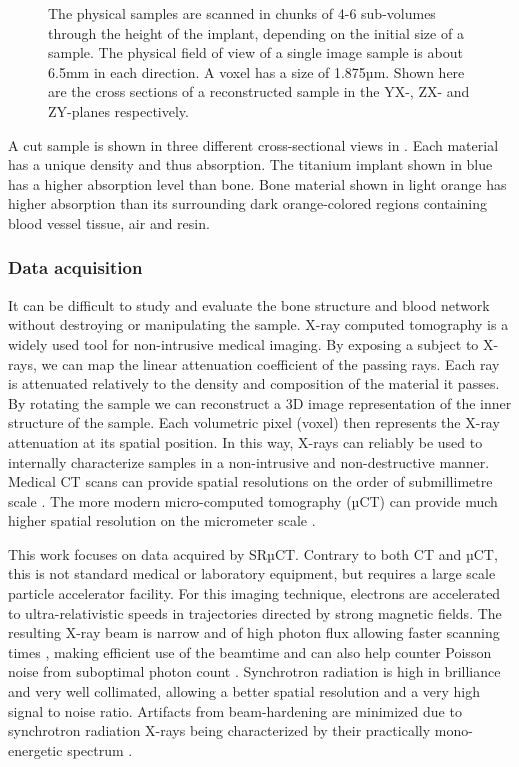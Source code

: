 \begin{figure}
\begin{tabular}{cc}
  \end{tabular}
  \caption{
	The physical samples are scanned in chunks of 4-6 sub-volumes through
	the height of the implant, depending on the initial size of a sample.
	The physical field of view of a single image sample is about 6.5mm in
	each direction. A voxel has a size of 1.875µm.  Shown here are the
	cross sections of a reconstructed sample in the YX-, ZX- and ZY-planes
	respectively.
  }
\label{fig:3viewsample}
\end{figure}

A cut sample is shown in three different cross-sectional views in
. Each material has a unique density and thus absorption.
The titanium implant shown in blue has a higher absorption level than bone.
Bone material shown in light orange has higher absorption than its surrounding
dark orange-colored regions containing blood vessel tissue, air and resin.

\subsubsection{Data acquisition}

It can be difficult to study and evaluate the bone structure and blood network
without destroying or manipulating the sample. X-ray computed tomography is a
widely used tool for non-intrusive medical imaging. By exposing a subject to
X-rays, we can map the linear attenuation coefficient of the passing rays. Each
ray is attenuated relatively to the density and composition of the material it
passes. By rotating the sample we can reconstruct a 3D image representation of
the inner structure of the sample. Each volumetric pixel (voxel) then
represents the X-ray attenuation at its spatial position. In this way, X-rays
can reliably be used to internally characterize samples in a non-intrusive and
non-destructive manner. Medical CT scans can provide spatial resolutions on the
order of submillimetre scale \citep{medicalct}. The more modern micro-computed
tomography (µCT) can provide much higher spatial resolution on the micrometer
scale \citep{srexptime}.

This work focuses on data acquired by SRµCT.  Contrary to both CT and µCT, this
is not standard medical or laboratory equipment, but requires a large scale
particle accelerator facility.  For this imaging technique, electrons are
accelerated to ultra-relativistic speeds in trajectories directed by strong
magnetic fields. The resulting X-ray beam is narrow and of high photon flux
allowing faster scanning times \citep{srexptime}, making efficient use of the
beamtime and can also help counter Poisson noise from suboptimal photon count
\citep{srnoise}. Synchrotron radiation is high in brilliance and very well
collimated, allowing a better spatial resolution and a very high signal to
noise ratio.  Artifacts from beam-hardening are minimized due to synchrotron
radiation X-rays being characterized by their practically mono-energetic
spectrum \citep{srbeamquality}.

